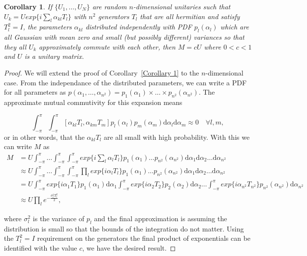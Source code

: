 \documentclass[aps,pra,twocolumn,superscriptaddress,numerical,floatfix]{revtex4-1}
\newtheorem{corollary}{Corollary}
\begin{document}
\begin{corollary}
\label{Corollary 2}
If $\{U_1,\ldots,U_N\}$ are random $n$-dimensional unitaries such that $U_k = U exp\{i \sum_l \alpha_{kl} T_l\}$ with $n^2$ generators $T_l$ that are all hermitian and satisfy $T_l^2=I$, the parameters $\alpha_{kl}$ distributed independently with PDF $p_{l}(\alpha_l)$ which are all Gaussian with mean zero and small (but possibly different) variances so that they all $U_k$ approximately commute with each other, then $M = c U$ where $0 < c < 1$ and $U$ is a unitary matrix.
\end{corollary}
\begin{proof}
We will extend the proof of Corollary~\ref{Corollary 1} to the $n$-dimensional case.  From the independance of the distributed parameters, we can write a PDF for all parameters as $p(\alpha_1,\ldots,\alpha_{n^{2}}) = p_1(\alpha_1)\times\ldots\times p_{n^2}(\alpha_{n^{2}})$.  
The approximate mutual commutivity for this expansion means 
\begin{widetext}
\newcommand{\theint}{\int^\pi_{-\pi} \ldots \int^\pi_{-\pi} \int^\pi_{-\pi}}
\newcommand{\theintd}{\mathrm{d}\alpha_1 \mathrm{d}\alpha_2 \ldots \mathrm{d}\alpha_{n^{2}}}
\begin{equation}
	\int^\pi_{-\pi} \int^\pi_{-\pi}
	[\alpha_{kl}T_{l},\alpha_{km}T_{m}] p_l(\alpha_l)p_m(\alpha_m) \mathrm{d}\alpha_l \mathrm{d}\alpha_m \approx 0 \quad \forall l,m,
\end{equation}
or in other words, that the $\alpha_{kl}T_l$ are all small with high probability.  With this we can write $M$ as
\begin{align}
	M &= U \theint
	exp\{i \sum_l \alpha_{l} T_l\} p_1(\alpha_1)\ldots p_{n^2}(\alpha_{n^{2}})
	\theintd
	\label{eq:general integral form} \\
	&\approx U \theint
	\prod_{l}exp\{i \alpha_{l} T_l\}p_1(\alpha_1)\ldots p_{n^2}(\alpha_{n^{2}})
	\theintd  \\
	&= U\int^\pi_{-\pi} exp\{i \alpha_{1} T_1\}p_1(\alpha_1) \mathrm{d}\alpha_1 	\int^\pi_{-\pi} exp\{i \alpha_{2} T_2\}p_2(\alpha_2) \mathrm{d}\alpha_2 \ldots \int^\pi_{-\pi}
	exp\{i \alpha_{n^2} T_{n^2}\}p_{n^2}(\alpha_{n^2}) \mathrm{d}\alpha_{n^2} \\
	&\approx U \prod_l e^{-\frac{\sigma_l^2 T_l^2}{2}},\label{eq:approx commuting, general case}
\end{align}
\end{widetext}
where $\sigma_l^2$ is the variance of $p_l$ and the final approximation is assuming the distribution is small so that the bounds of the integration do not matter.  Using the $T_l^2=I$ requirement on the generators the final product of exponentials can be identified with the value $c$, we have the desired result.
\end{proof}
\end{document}
